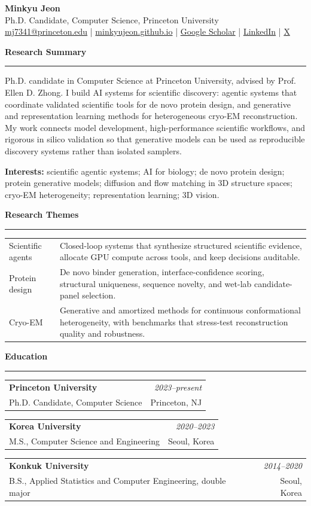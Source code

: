 \documentclass[10pt,letterpaper]{article}
\makeatletter
\newcommand{\cvsection}[1]{%
  \vspace{8pt}
  {\large\bfseries\color{accent} #1}\par
  \vspace{2pt}\hrule\vspace{5pt}
}
\newcommand{\entry}[4]{%
  \begin{tabularx}{\textwidth}{@{}>{\raggedright\arraybackslash}X r@{}}
    \textbf{#1} & \textit{#2}\\
    #3 & #4
  \end{tabularx}\vspace{2pt}
}
\makeatother
\begin{document}
\small

\begin{center}
  {\LARGE \textbf{Minkyu Jeon}}\\
  \vspace{3pt}
  Ph.D. Candidate, Computer Science, Princeton University\\
  \href{mailto:mj7341@princeton.edu}{mj7341@princeton.edu}
  \quad|\quad
  \href{https://minkyujeon.github.io}{minkyujeon.github.io}
  \quad|\quad
  \href{https://scholar.google.com/citations?hl=en&user=kyQR6ecAAAAJ}{Google Scholar}
  \quad|\quad
  \href{https://www.linkedin.com/in/minkyu-jeon-9a5b92152/}{LinkedIn}
  \quad|\quad
  \href{https://x.com/MinkyuJeon19791}{X}
\end{center}

\cvsection{Research Summary}
Ph.D. candidate in Computer Science at Princeton University, advised by Prof. Ellen D. Zhong. I build AI systems for scientific discovery: agentic systems that coordinate validated scientific tools for de novo protein design, and generative and representation learning methods for heterogeneous cryo-EM reconstruction. My work connects model development, high-performance scientific workflows, and rigorous in silico validation so that generative models can be used as reproducible discovery systems rather than isolated samplers.

\vspace{3pt}
\textbf{Interests:} scientific agentic systems; AI for biology; de novo protein design; protein generative models; diffusion and flow matching in 3D structure spaces; cryo-EM heterogeneity; representation learning; 3D vision.

\cvsection{Research Themes}
\begin{tabularx}{\textwidth}{@{}p{2.45cm}>{\raggedright\arraybackslash}X@{}}
Scientific agents & Closed-loop systems that synthesize structured scientific evidence, allocate GPU compute across tools, and keep decisions auditable.\\
Protein design & De novo binder generation, interface-confidence scoring, structural uniqueness, sequence novelty, and wet-lab candidate-panel selection.\\
Cryo-EM & Generative and amortized methods for continuous conformational heterogeneity, with benchmarks that stress-test reconstruction quality and robustness.\\
\end{tabularx}

\cvsection{Education}
\entry{Princeton University}{2023--present}{Ph.D. Candidate, Computer Science}{Princeton, NJ}
\entry{Korea University}{2020--2023}{M.S., Computer Science and Engineering}{Seoul, Korea}
\entry{Konkuk University}{2014--2020}{B.S., Applied Statistics and Computer Engineering, double major}{Seoul, Korea}
\end{document}

